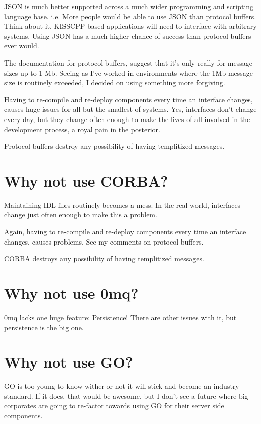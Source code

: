 \begin{DoxyEnumerate}
\item J\-S\-O\-N is much better supported across a much wider programming and scripting language base. i.\-e. More people would be able to use J\-S\-O\-N than protocol buffers. Think about it. K\-I\-S\-S\-C\-P\-P based applications will need to interface with arbitrary systems. Using J\-S\-O\-N has a much higher chance of success than protocol buffers ever would.
\item The documentation for protocol buffers, suggest that it's only really for message sizes up to 1 Mb. Seeing as I've worked in environments where the 1\-Mb message size is routinely exceeded, I decided on using something more forgiving.
\item Having to re-\/compile and re-\/deploy components every time an interface changes, causes huge issues for all but the smallest of systems. Yes, interfaces don't change every day, but they change often enough to make the lives of all involved in the development process, a royal pain in the posterior.
\item Protocol buffers destroy any possibility of having templitized messages.
\end{DoxyEnumerate}

\section*{Why not use C\-O\-R\-B\-A?}


\begin{DoxyEnumerate}
\item Maintaining I\-D\-L files routinely becomes a mess. In the real-\/world, interfaces change just often enough to make this a problem.
\item Again, having to re-\/compile and re-\/deploy components every time an interface changes, causes problems. See my comments on protocol buffers.
\item C\-O\-R\-B\-A destroys any possibility of having templitized messages.
\end{DoxyEnumerate}

\section*{Why not use 0mq?}

0mq lacks one huge feature\-: Persistence! There are other issues with it, but persistence is the big one.

\section*{Why not use G\-O?}

G\-O is too young to know wither or not it will stick and become an industry standard. If it does, that would be awesome, but I don't see a future where big corporates are going to re-\/factor towards using G\-O for their server side components. 